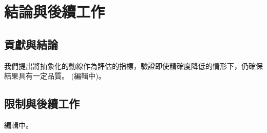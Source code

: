 \chapter{結論與後續工作}
\label{cha:conclusions}

\section{貢獻與結論}

我們提出將抽象化的動線作為評估的指標，驗證即使精確度降低的情形下，仍確保結果具有一定品質。 (編輯中)。

\section{限制與後續工作} 

編輯中。
